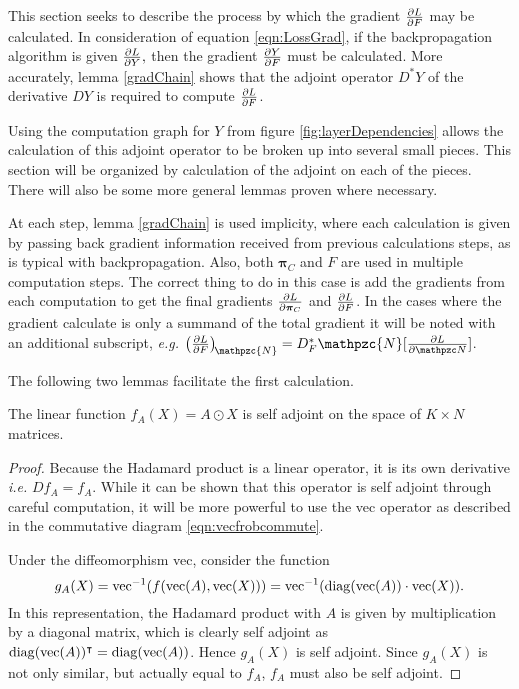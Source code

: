 \label{subsect:dLdYcalc}
This section seeks to describe the process by which the gradient \( \pdv{L}{F} \) may be calculated.  In consideration of equation \eqref{eqn:LossGrad}, if the backpropagation algorithm is given \(\pdv{L}{Y},\) then the gradient \( \pdv{Y}{F} \) must be calculated.  More accurately, lemma \ref{gradChain} shows that the adjoint operator \( D^{\ast}Y \) of the derivative \( DY \) is required to compute \( \pdv{L}{F} \).  

Using the computation graph for $Y$ from figure \ref{fig:layerDependencies} allows the calculation of this adjoint operator to be broken up into several small pieces. This section will be organized by calculation of the adjoint on each of the pieces.  There will also be some more general lemmas proven where necessary.

At each step, lemma \ref{gradChain} is used implicity, where each calculation is given by passing back gradient information received from previous calculations steps, as is typical with backpropagation. Also, both \( \bm\pi_C \) and \( F \) are used in multiple computation steps.  The correct thing to do in this case is add the gradients from each computation to get the final gradients \( \pdv{L}{\bm\pi_C} \) and \( \pdv{L}{F} \). In the cases where the gradient calculate is only a summand of the total gradient it will be noted with an additional subscript, \textit{e.g.} \( \left(\pdv{L}{F}\right)_{\!\mathpzc{N}} =  D_F^{\ast}\mathpzc{N}[\pdv{L}{\mathpzc N}]\).


The following two lemmas facilitate the first calculation.
\begin{lemm}\label{lemm:hadProdAdj}
	The linear function $f_A(X)=A\odot X$ is self adjoint on the space of \( K\times N \) matrices.
\end{lemm}
\begin{proof}
	Because the Hadamard product is a linear operator, it is its own derivative \textit{i.e.} \( Df_A=f_A \). While it can be shown that this operator is self adjoint through careful computation, it will be more powerful to use the vec operator as described in the commutative diagram \eqref{eqn:vecfrobcommute}.
	
	Under the diffeomorphism vec, consider the function
	\[ g_A(X) = \operatorname{vec}^{-1}(f(\operatorname{vec}(A),\operatorname{vec}(X))) =\operatorname{vec}^{-1}(\operatorname*{diag}(\operatorname{vec}(A)) \cdot\operatorname{vec}(X)). \] 
	In this representation, the Hadamard product with \( A \) is given by multiplication by a diagonal matrix, which is clearly self adjoint as \( \operatorname*{diag}(\operatorname{vec}(A))^{\intercal} = \operatorname*{diag}(\operatorname{vec}(A))\).  Hence \( g_A(X) \) is self adjoint.  Since \( g_A(X) \) is not only similar, but actually equal to \( f_A \), \(f_A \) must also be self adjoint.
\end{proof}

